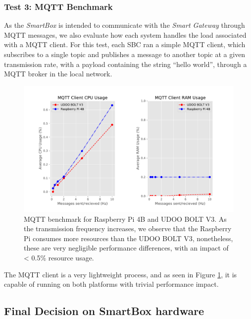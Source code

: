 \subsubsection{Test 3: \acs{MQTT} Benchmark}

As the \textit{SmartBox} is intended to communicate with the \textit{Smart Gateway} through \acs{MQTT} messages, we also evaluate how each system handles the load associated with a \acs{MQTT} client. For this test, each \acs{SBC} ran a simple \acs{MQTT} client, which subscribes to a single topic and publishes a message to another topic at a given transmission rate, with a payload containing the string ``hello world'', through a \acs{MQTT} broker in the local network.

\begin{figure}[H]
    \centering
    \includegraphics[width=\linewidth]{images/mqtt_test_results.pdf}
    \caption[\acs{MQTT} benchmark for Raspberry Pi 4B and UDOO BOLT V3.]{\acs{MQTT} benchmark for Raspberry Pi 4B and UDOO BOLT V3. As the transmission frequency increases, we observe that the Raspberry Pi consumes more resources than the UDOO BOLT V3, nonetheless, these are very negligible performance differences, with an impact of < 0.5\% resource usage.}
    \label{fig:mqtt-tests}
\end{figure}

The \acs{MQTT} client is a very lightweight process, and as seen in Figure \ref{fig:mqtt-tests}, it is capable of running on both platforms with trivial performance impact.

\subsection{Final Decision on SmartBox hardware}

